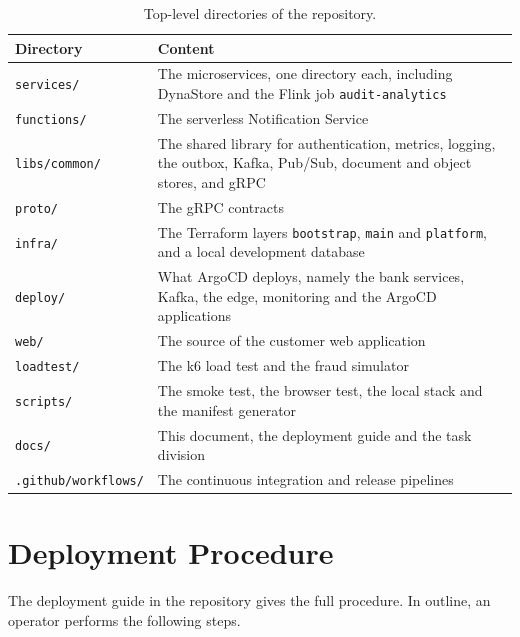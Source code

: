 \documentclass[11pt,a4paper]{article}
\newcommand{\code}[1]{\texttt{#1}}
\begin{document}
\begin{table}[H]\centering\small
\caption{Top-level directories of the repository.}\label{tab:repo}
\begin{tabularx}{\linewidth}{@{}L{3.6cm}Y@{}}
\toprule
Directory & Content \\
\midrule
\code{services/} & The microservices, one directory each, including DynaStore and the Flink job \code{audit-analytics} \\
\code{functions/} & The serverless Notification Service \\
\code{libs/common/} & The shared library for authentication, metrics, logging, the outbox, Kafka, Pub/Sub, document and object stores, and gRPC \\
\code{proto/} & The gRPC contracts \\
\code{infra/} & The Terraform layers \code{bootstrap}, \code{main} and \code{platform}, and a local development database \\
\code{deploy/} & What ArgoCD deploys, namely the bank services, Kafka, the edge, monitoring and the ArgoCD applications \\
\code{web/} & The source of the customer web application \\
\code{loadtest/} & The k6 load test and the fraud simulator \\
\code{scripts/} & The smoke test, the browser test, the local stack and the manifest generator \\
\code{docs/} & This document, the deployment guide and the task division \\
\code{.github/workflows/} & The continuous integration and release pipelines \\
\bottomrule
\end{tabularx}
\end{table}

\section{Deployment Procedure}
\label{app:deploy}

The deployment guide in the repository gives the full procedure. In outline, an operator performs the following steps.
\end{document}
